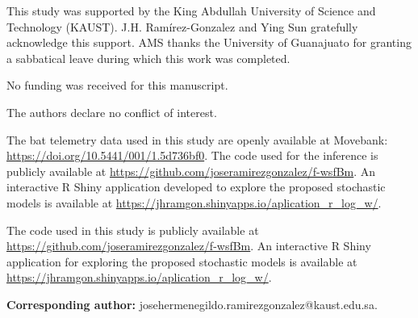 \documentclass[preprint,12pt,authoryear]{elsarticle}
\begin{document}






This study was supported by the King Abdullah University of Science and Technology (KAUST). J.H. Ram\'irez-Gonzalez and Ying Sun gratefully acknowledge this support. AMS thanks the University of Guanajuato for granting a sabbatical leave during which this work was completed.

\medskip

No funding was received for this manuscript.

\medskip

The authors declare no conflict of interest.

\medskip

The bat telemetry data used in this study are openly available at Movebank: \url{https://doi.org/10.5441/001/1.5d736bf0}. The code used for the inference is publicly available at \url{https://github.com/joseramirezgonzalez/f-wsfBm}. An interactive R Shiny application developed to explore the proposed stochastic models is available at \url{https://jhramgon.shinyapps.io/aplication_r_log_w/}.

\medskip

The code used in this study is publicly available at \url{https://github.com/joseramirezgonzalez/f-wsfBm}. An interactive R Shiny application for exploring the proposed stochastic models is available at \url{https://jhramgon.shinyapps.io/aplication_r_log_w/}.


\textbf{Corresponding author:} josehermenegildo.ramirezgonzalez@kaust.edu.sa.

\end{document}
